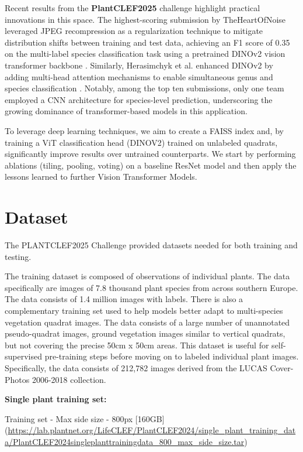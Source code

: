 \documentclass[conference]{IEEEtran}
\begin{document}
Recent results from the \textbf{PlantCLEF2025} challenge highlight practical innovations in this space. The highest-scoring submission by TheHeartOfNoise leveraged JPEG recompression as a regularization 
technique to mitigate distribution shifts between training and test data, achieving an F1 score of 0.35 on the multi-label species classification task using a pretrained DINOv2 vision transformer backbone 
\cite{martellucci2025overviewplantclef2025multispecies}. Similarly, Herasimchyk et al. enhanced DINOv2 by adding multi-head attention mechanisms to enable simultaneous genus and species classification \cite{herasimchyk2025multilabelplantspeciesprediction}. Notably, among the 
top ten submissions, only one team employed a CNN architecture for species-level prediction, underscoring the growing dominance of transformer-based models in this application.

To leverage deep learning techniques, we aim to create a FAISS index and, by training a ViT classification head (DINOV2) trained on unlabeled quadrats, significantly improve results over untrained counterparts. We start by performing ablations (tiling, pooling, voting) on a baseline ResNet model and then apply the lessons learned to further Vision Transformer Models. 


\section{Dataset}

The PLANTCLEF2025 Challenge provided datasets needed for both training and testing. 

The training dataset is composed of observations of individual plants. The data specifically are images of 7.8 thousand plant species from across southern Europe. The data consists of 1.4 million images with labels. There is also a complementary training set used to help models better adapt to multi-species vegetation quadrat images. The data consists of a large number of unannotated pseudo-quadrat images, ground vegetation images similar to vertical quadrats, but not covering the precise 50cm x 50cm areas. This dataset is useful for self-supervised pre-training steps before moving on to labeled individual plant images. Specifically, the data consists of 212,782 images derived from the LUCAS Cover-Photos 2006-2018 collection.\cite{essd-14-4463-2022} \cite{martellucci2025overviewplantclef2025multispecies}

\textbf{Single plant training set:} 

    Training set - Max side size - 800px [160GB]
(\url{https://lab.plantnet.org/LifeCLEF/PlantCLEF2024/single_plant_training_data/PlantCLEF2024singleplanttrainingdata_800_max_side_size.tar})
\end{document}
